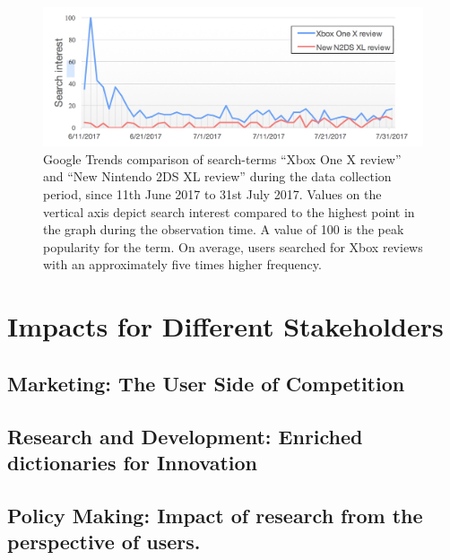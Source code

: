 \documentclass[]{book}
\begin{document}
\begin{figure}

{\centering \includegraphics[width=1\linewidth]{_bookdown_files/figures/tweet_search_interest} 

}

\caption{Google Trends comparison of search-terms “Xbox One X review” and “New Nintendo 2DS XL review” during the data collection period, since 11th June 2017 to 31st July 2017. Values on the vertical axis depict search interest compared to the highest point in the graph during the observation time. A value of 100 is the peak popularity for the term. On average, users searched for Xbox reviews with an approximately five times higher frequency.}\label{fig:tweetsearchinterest}
\end{figure}

\part{Impacts for Different
Stakeholders}\label{part-impacts-for-different-stakeholders}

\chapter{Marketing: The User Side of
Competition}\label{marketing-the-user-side-of-competition}

\chapter{Research and Development: Enriched dictionaries for
Innovation}\label{research-and-development-enriched-dictionaries-for-innovation}

\chapter{Policy Making: Impact of research from the perspective of
users.}\label{policy-making-impact-of-research-from-the-perspective-of-users.}
\end{document}
